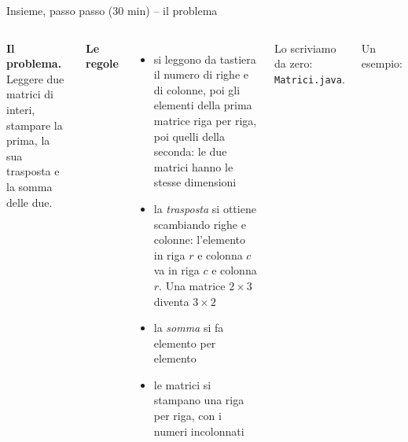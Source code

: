 \documentclass[10pt,aspectratio=169]{beamer}
\begin{document}
\begin{frame}[fragile]{Insieme, passo passo (30 min) -- il problema}
\begin{columns}[T]
\small
\textbf{Il problema.} Leggere due matrici di interi, stampare la prima, la sua trasposta e la somma delle due.

\vspace{0.2cm}
\textbf{Le regole}
\begin{itemize}\itemsep=3pt
    \item si leggono da tastiera il numero di righe e di colonne, poi gli elementi della prima matrice riga per riga, poi quelli della seconda: le due matrici hanno le stesse dimensioni
    \item la \emph{trasposta} si ottiene scambiando righe e colonne: l'elemento in riga $r$ e colonna $c$ va in riga $c$ e colonna $r$. Una matrice $2 \times 3$ diventa $3 \times 2$
    \item la \emph{somma} si fa elemento per elemento
    \item le matrici si stampano una riga per riga, con i numeri incolonnati
\end{itemize}

\vspace{0.2cm}
Lo scriviamo da zero: \texttt{Matrici.java}.

{\small Un esempio:}
\end{columns}
\end{frame}
\end{document}
